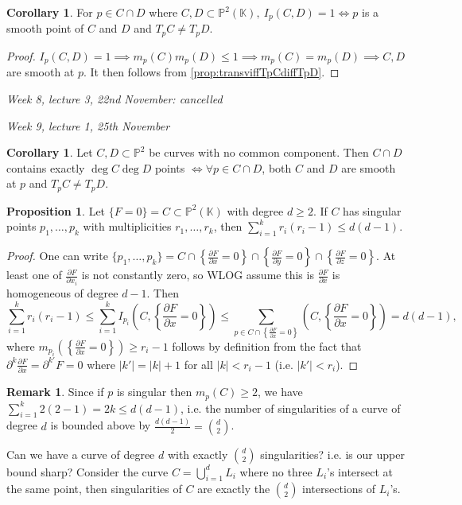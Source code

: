 \documentclass{article}
\newcommand{\K}{\mathbb{K}}
\newcommand{\p}{\mathbb{P}}
\theoremstyle{definition}
\newtheorem{prop}[defn]{Proposition}
\newtheorem{coro}[defn]{Corollary}
\newtheorem{remark}[defn]{Remark}
\begin{document}
\begin{coro}
For $p\in C\cap D$ where $C,D\subset\p^2(\K),\ I_p(C,D)=1\iff p$ is a smooth point of $C$ and $D$ and $T_pC\neq T_pD$.
\end{coro}
\begin{proof}
$I_p(C,D)=1\implies m_p(C)m_p(D)\leq 1\implies m_p(C)=m_p(D)\implies C,D$ are smooth at $p$. It then follows from \ref{prop:transviffTpCdiffTpD}.
\end{proof}

\begin{flushright}
\textit{Week 8, lecture 3, 22nd November: cancelled}
\end{flushright}

\begin{flushright}
\textit{Week 9, lecture 1, 25th November}
\end{flushright}

\begin{coro}
Let $C,D\subset\p^2$ be curves with no common component. Then $C\cap D$ contains exactly $\deg C\deg D$ points $\iff\forall p\in C\cap D$, both $C$ and $D$ are smooth at $p$ and $T_pC\neq T_pD$.
\end{coro}

\begin{prop}
Let $\{F=0\}=C\subset\p^2(\K)$ with degree $d\geq 2$. If $C$ has singular points $p_1,\ldots,p_k$ with multiplicities $r_1,\ldots,r_k$, then $\sum_{i=1}^k r_i(r_i-1)\leq d(d-1)$.
\end{prop}
\begin{proof}
One can write $\{p_1,\ldots,p_k\}=C\cap\left\{\frac{\partial F}{\partial x}=0\right\}\cap\left\{\frac{\partial F}{\partial y}=0\right\}\cap\left\{\frac{\partial F}{\partial z}=0\right\}$. At least one of $\frac{\partial F}{\partial x_i}$ is not constantly zero, so WLOG assume this is $\frac{\partial F}{\partial x}$ is homogeneous of degree $d-1$. Then
\[
\sum_{i=1}^k r_i(r_i-1)\leq \sum_{i=1}^k I_{p_i}\left(C,\left\{\frac{\partial F}{\partial x}=0\right\}\right)\leq \sum_{p\in C\cap\left\{\frac{\partial F}{\partial x}=0\right\}}\left(C,\left\{\frac{\partial F}{\partial x}=0\right\}\right)=d(d-1),
\]
where $m_{p_i}\left(\left\{\frac{\partial F}{\partial x}=0\right\}\right)\geq r_i-1$ follows by definition from the fact that $\partial^k\frac{\partial F}{\partial x}=\partial^{k'}F=0$ where $|k'|=|k|+1$ for all $|k|<r_i-1$ (i.e. $|k'|<r_i$).
\end{proof}

\begin{remark}
Since if $p$ is singular then $m_p(C)\geq 2$, we have $\sum_{i=1}^k 2(2-1)=2k\leq d(d-1)$, i.e. the number of singularities of a curve of degree $d$ is bounded above by $\frac{d(d-1)}{2}=\binom{d}{2}$.

Can we have a curve of degree $d$ with exactly $\binom{d}{2}$ singularities? i.e. is our upper bound sharp? Consider the curve $C=\bigcup_{i=1}^d L_i$ where no three $L_i$'s intersect at the same point, then singularities of $C$ are exactly the $\binom{d}{2}$ intersections of $L_i$'s.
\end{remark}
\end{document}
